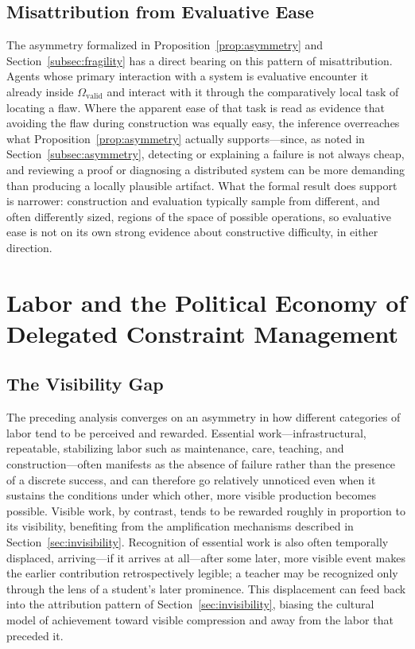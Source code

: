 \documentclass[12pt, a4paper]{article}
\theoremstyle{plain}
\theoremstyle{definition}
\theoremstyle{remark}
\begin{document}
\subsection{Misattribution from Evaluative Ease}

The asymmetry formalized in Proposition~\ref{prop:asymmetry} and Section~\ref{subsec:fragility} has a direct bearing on this pattern of misattribution. Agents whose primary interaction with a system is evaluative encounter it already inside $\Omega_{\mathrm{valid}}$ and interact with it through the comparatively local task of locating a flaw. Where the apparent ease of that task is read as evidence that avoiding the flaw during construction was equally easy, the inference overreaches what Proposition~\ref{prop:asymmetry} actually supports---since, as noted in Section~\ref{subsec:asymmetry}, detecting or explaining a failure is not always cheap, and reviewing a proof or diagnosing a distributed system can be more demanding than producing a locally plausible artifact. What the formal result does support is narrower: construction and evaluation typically sample from different, and often differently sized, regions of the space of possible operations, so evaluative ease is not on its own strong evidence about constructive difficulty, in either direction.

\section{Labor and the Political Economy of Delegated Constraint Management}
\label{sec:labor}

\subsection{The Visibility Gap}

The preceding analysis converges on an asymmetry in how different categories of labor tend to be perceived and rewarded. Essential work---infrastructural, repeatable, stabilizing labor such as maintenance, care, teaching, and construction---often manifests as the absence of failure rather than the presence of a discrete success, and can therefore go relatively unnoticed even when it sustains the conditions under which other, more visible production becomes possible. Visible work, by contrast, tends to be rewarded roughly in proportion to its visibility, benefiting from the amplification mechanisms described in Section~\ref{sec:invisibility}. Recognition of essential work is also often temporally displaced, arriving---if it arrives at all---after some later, more visible event makes the earlier contribution retrospectively legible; a teacher may be recognized only through the lens of a student's later prominence. This displacement can feed back into the attribution pattern of Section~\ref{sec:invisibility}, biasing the cultural model of achievement toward visible compression and away from the labor that preceded it.
\end{document}
